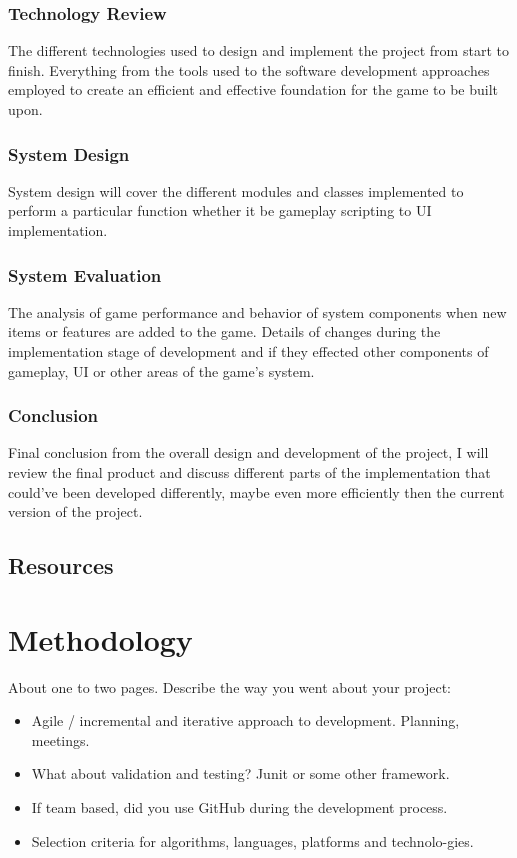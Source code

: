 \subsection{Technology Review}
The different technologies used to design and implement the project from start to finish. Everything from the tools used to the software development approaches employed to create an efficient and effective foundation for the game to be built upon.
\subsection{System Design}
System design will cover the different modules and classes implemented to perform a particular function whether it be gameplay scripting to UI implementation.
\subsection{System Evaluation}
The analysis of game performance and behavior of system components when new items or features are added to the game. Details of changes during the implementation stage of development and if they effected other components of gameplay, UI or other areas of the game's system.
\subsection{Conclusion}
Final conclusion from the overall design and development of the project, I will review the final product and discuss different parts of the implementation that could've been developed differently, maybe even more efficiently then the current version of the project.
\section{Resources}

\chapter{Methodology}
About one to two pages.
Describe the way you went about your project:
\begin{itemize}
\item Agile / incremental and iterative approach to development. Planning, meetings.
\item What about validation and testing? Junit or some other framework.
\item If team based, did you use GitHub during the development process.
\item Selection criteria for algorithms, languages, platforms and technolo-gies.
\end{itemize}

